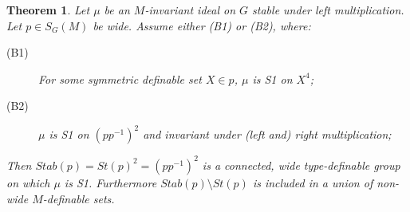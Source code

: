 \documentclass[12pt]{article}
\newtheorem{thm}{Theorem}[section]
\theoremstyle{definition}
\theoremstyle{mystyle}
\theoremstyle{remark}
\newcommand{\tp}{\mathrm{tp}}
\begin{document}
\begin{thm}\label{th_babystab}
Let $\mu$ be an $M$-invariant ideal on $G$ stable under left multiplication. Let $p\in S_G(M)$ be wide. Assume either (B1) or (B2), where:
\begin{description}
\item[(B1)] For some symmetric definable set $X\in p$, $\mu$ is S1 on $X^4$;

\item[(B2)] $\mu$ is S1 on $(pp^{-1})^2$ and invariant under (left and) right multiplication;


\end{description}
Then $Stab(p)=St(p)^2 = (pp^{-1})^2$ is a connected, wide type-definable group on which $\mu$ is S1. Furthermore $Stab(p)\setminus St(p)$ is included in a union of non-wide $M$-definable sets.
\end{thm}
\end{document}
